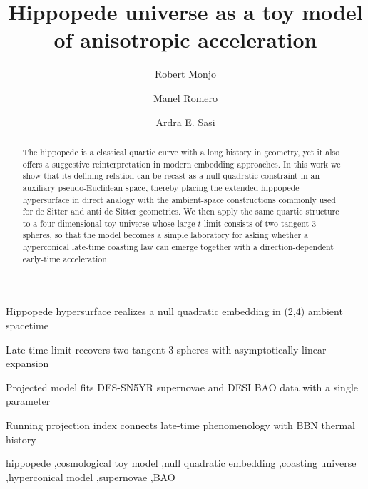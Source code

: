 \documentclass[3p,times,twocolumn]{elsarticle}
\begin{document}
\begin{frontmatter}

\title{Hippopede universe as a toy model of anisotropic acceleration}

\author[cunef,chile]{Robert Monjo}
\author[barcelona]{Manel Romero}
\author[mgU]{Ardra E. Sasi}

\address[cunef]{Department of Mathematics, CUNEF Universidad, Calle Almansa 101, Madrid 28040, Spain}
\address[chile]{Centro de Estudios Cosmologicos ``Prof. Jaime Roessler Bonzi'', Facultad de Ciencias, Universidad de Chile, Las Palmeras 3425, \~Nunoa, Santiago 7750000, Chile}
\address[barcelona]{Area of Chemistry, University of Barcelona, Campus Diagonal: Av. Joan XXIII, 27-31, 08028 Barcelona, Spain}
\address[mgU]{School of Pure and Applied Physics, Mahatma Gandhi University, Priyadarsini Hills P.O. Athirampuzha, Kottayam, Kerala 686560, India}

\begin{abstract}
The hippopede is a classical quartic curve with a long history in geometry, yet it also offers a suggestive reinterpretation in modern embedding approaches. In this work we show that its defining relation can be recast as a null quadratic constraint in an auxiliary pseudo-Euclidean space, thereby placing the extended hippopede hypersurface in direct analogy with the ambient-space constructions commonly used for de Sitter and anti de Sitter geometries. We then apply the same quartic structure to a four-dimensional toy universe whose large-$t$ limit consists of two tangent $3$-spheres, so that the model becomes a simple laboratory for asking whether a hyperconical late-time coasting law can emerge together with a direction-dependent early-time acceleration.
\end{abstract}

\begin{highlights}
\item Hippopede hypersurface realizes a null quadratic embedding in (2,4) ambient spacetime
\item Late-time limit recovers two tangent 3-spheres with asymptotically linear expansion
\item Projected model fits DES-SN5YR supernovae and DESI BAO data with a single parameter
\item Running projection index connects late-time phenomenology with BBN thermal history
\end{highlights}

\begin{keyword}
hippopede \sep cosmological toy model \sep null quadratic embedding \sep coasting universe \sep hyperconical model \sep supernovae \sep BAO
\end{keyword}

\end{frontmatter}
\end{document}
